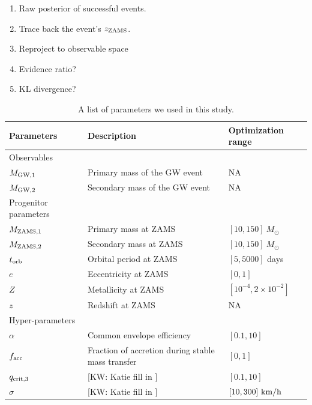 \documentclass[twocolumn]{aastex631}
\newcommand{\kw}[1]{{\color{rb4}[KW: #1 ]}}
\begin{document}
\begin{enumerate}
\item Raw posterior of successful events.
\item Trace back the event's $z_{\rm ZAMS}$.
\item Reproject to observable space
\item Evidence ratio?
\item KL divergence?
\end{enumerate}

\begin{table}[hbt!]
    \begin{center}
    \begin{tabular}{ l l l }
    \hline
    \hline
    Parameters &  Description & Optimization range\\
    \hline
    \hline
    Observables &\ &\  \\
    \hline
    \hline
    $M_{\rm GW,1}$ & Primary mass of the GW event & NA \\
    $M_{\rm GW,2}$ & Secondary mass of the GW event  & NA\\
    \hline
    \hline
    Progenitor parameters &\ &\  \\
    \hline
    \hline
    $M_{\rm ZAMS,1}$ & Primary mass at ZAMS & $[10,150]\ M_{\odot}$\\
    $M_{\rm ZAMS,2}$ & Secondary mass at ZAMS & $[10,150]\ M_{\odot}$\\
    $t_{\rm orb}$ & Orbital period at ZAMS & $[5,5000]$ days\\
    $e$ & Eccentricity at ZAMS & $[0,1]$\\
    $Z$ & Metallicity at ZAMS & $[10^{-4},2\times10^{-2}]$\\
    $z$ & Redshift at ZAMS & NA\\
    \hline
    \hline
    Hyper-parameters &\ &\ \\
    \hline
    \hline
    
    $\alpha$ & Common envelope efficiency & $[0.1,10]$\\
    $f_{\rm acc}$ & Fraction of accretion during stable mass transfer & $[0,1]$\\
    $q_{\rm crit,3}$ & \kw{Katie fill in} & $[0.1,10]$\\
    $\sigma$ & \kw{Katie fill in}& $[10,300]\ {\rm km/h}$\\


    \hline
    \hline
    \end{tabular}
    \caption{A list of parameters we used in this study.}
    \label{tab:parameters}
    \end{center}
\end{table}
    
\end{document}
